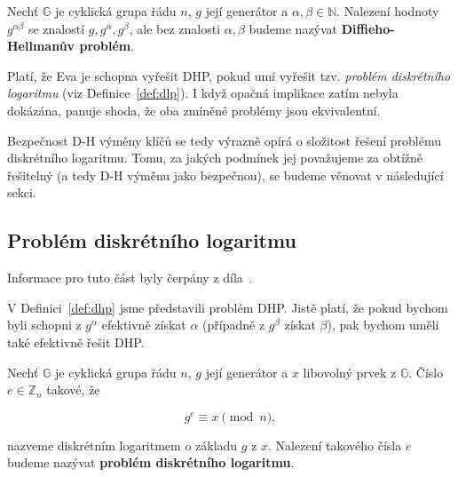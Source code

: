 \documentclass[
  program=infoi,
  biblatex=false,
  figures=true,
  glossaries,
  tables=false,
  sourcecodes=true,
  index
]{kidiplom}
\begin{document}
        \begin{definition}\label{def:dhp}
        
            Nechť $\mathbb{G}$ je cyklická grupa řádu $n$, $g$ její generátor a $\alpha, \beta \in \mathbb{N}$.
            Nalezení hodnoty $g^{\alpha \beta}$ se znalostí $g, g^\alpha, g^\beta$, ale bez znalosti $\alpha, \beta$
            budeme nazývat \textbf{Diffieho-Hellmanův problém}.
    
        \end{definition}

        Platí, že Eva je schopna vyřešit DHP, pokud umí vyřešit tzv. \emph{problém diskrétního logaritmu} (viz Definice~\ref{def:dlp}).
        I když opačná implikace zatím nebyla dokázána, panuje shoda, že oba zmíněné problémy jsou ekvivalentní.

        Bezpečnost D-H výměny klíčů se tedy výrazně opírá o složitost řešení problému diskrétního logaritmu.
        Tomu, za jakých podmínek jej považujeme za obtížně řešitelný (a tedy D-H výměnu jako bezpečnou),
        se budeme věnovat v následující sekci.
    
        
        

\subsection{Problém diskrétního logaritmu}\label{sub:discrete-log}
    
    Informace pro tuto část byly čerpány z díla~\cite{graduate-course}.

    V Definici~\ref{def:dhp} jsme představili problém DHP.
    Jistě platí, že pokud bychom byli schopni z $g^\alpha$ efektivně získat $\alpha$ (případně z $g^\beta$ získat $\beta$), pak
    bychom uměli také efektivně řešit DHP.

    \begin{definition}\label{def:dlp}
        
        Nechť $\mathbb{G}$ je cyklická grupa řádu $n$, $g$ její generátor a $x$ libovolný prvek z $\mathbb{G}$.
        Číslo $e \in \mathbb{Z}_n$ takové, že

            \begin{equation}\label{eq:discrete-log}
                g^e \equiv x \pmod{n},
            \end{equation}
        
        \noindent
        nazveme diskrétním logaritmem o základu $g$ z $x$.
        Nalezení takového čísla $e$ budeme nazývat \textbf{problém diskrétního logaritmu}.

    \end{definition}
    
\end{document}
